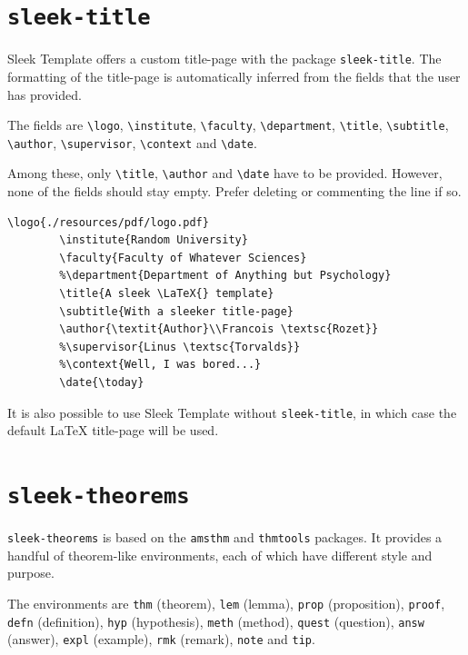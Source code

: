 \documentclass[12pt]{report}
\def\tbs{\textbackslash}
\begin{document}
    \newpage

    \section{\texttt{sleek-title}}

    Sleek Template offers a custom title-page with the package \texttt{sleek-title}. The formatting of the title-page is automatically inferred from the fields that the user has provided.

    The fields are \texttt{\tbs{}logo}, \texttt{\tbs{}institute}, \texttt{\tbs{}faculty}, \texttt{\tbs{}department}, \texttt{\tbs{}title}, \texttt{\tbs{}subtitle}, \texttt{\tbs{}author}, \texttt{\tbs{}supervisor}, \texttt{\tbs{}context} and \texttt{\tbs{}date}.

    Among these, only \texttt{\tbs{}title}, \texttt{\tbs{}author} and \texttt{\tbs{}date} have to be provided. However, none of the fields should stay empty. Prefer deleting or commenting the line if so.

    \begin{lstlisting}[style=latexFrameTB, caption={Example of \texttt{sleek-title} title-page definition.}, gobble=8]
        \logo{./resources/pdf/logo.pdf}
        \institute{Random University}
        \faculty{Faculty of Whatever Sciences}
        %\department{Department of Anything but Psychology}
        \title{A sleek \LaTeX{} template}
        \subtitle{With a sleeker title-page}
        \author{\textit{Author}\\Francois \textsc{Rozet}}
        %\supervisor{Linus \textsc{Torvalds}}
        %\context{Well, I was bored...}
        \date{\today}
    \end{lstlisting}

    It is also possible to use Sleek Template without \texttt{sleek-title}, in which case the default \LaTeX{} title-page will be used.

    \newpage

    \section{\texttt{sleek-theorems}}

    \texttt{sleek-theorems} is based on the \texttt{amsthm} and \texttt{thmtools} packages. It provides a handful of theorem-like environments, each of which have different style and purpose.

    The environments are \texttt{thm} (theorem), \texttt{lem} (lemma), \texttt{prop} (proposition), \texttt{proof}, \texttt{defn} (definition), \texttt{hyp} (hypothesis), \texttt{meth} (method), \texttt{quest} (question), \texttt{answ} (answer), \texttt{expl} (example), \texttt{rmk} (remark), \texttt{note} and \texttt{tip}.
\end{document}
